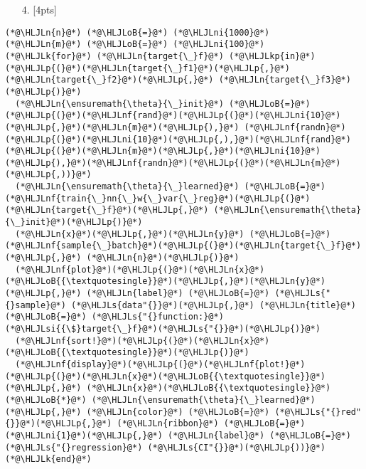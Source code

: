 \documentclass[12pt,a4paper]{article}
\newcommand{\HLJLk}[1]{\textcolor[RGB]{148,91,176}{\textbf{#1}}}
\newcommand{\HLJLkp}[1]{\textcolor[RGB]{148,91,176}{\textbf{#1}}}
\newcommand{\HLJLn}[1]{#1}
\newcommand{\HLJLnf}[1]{\textcolor[RGB]{66,102,213}{#1}}
\newcommand{\HLJLs}[1]{\textcolor[RGB]{201,61,57}{#1}}
\newcommand{\HLJLsi}[1]{#1}
\newcommand{\HLJLni}[1]{\textcolor[RGB]{59,151,46}{#1}}
\newcommand{\HLJLoB}[1]{\textcolor[RGB]{102,102,102}{\textbf{#1}}}
\newcommand{\HLJLp}[1]{#1}
\begin{document}
\begin{itemize}
\item[4. ] [4pts]

\end{itemize}

\begin{lstlisting}
(*@\HLJLn{n}@*) (*@\HLJLoB{=}@*) (*@\HLJLni{1000}@*)
(*@\HLJLn{m}@*) (*@\HLJLoB{=}@*) (*@\HLJLni{100}@*)
(*@\HLJLk{for}@*) (*@\HLJLn{target{\_}f}@*) (*@\HLJLkp{in}@*) (*@\HLJLp{(}@*)(*@\HLJLn{target{\_}f1}@*)(*@\HLJLp{,}@*) (*@\HLJLn{target{\_}f2}@*)(*@\HLJLp{,}@*) (*@\HLJLn{target{\_}f3}@*)(*@\HLJLp{)}@*)
  (*@\HLJLn{\ensuremath{\theta}{\_}init}@*) (*@\HLJLoB{=}@*) (*@\HLJLp{(}@*)(*@\HLJLnf{rand}@*)(*@\HLJLp{(}@*)(*@\HLJLni{10}@*)(*@\HLJLp{,}@*)(*@\HLJLn{m}@*)(*@\HLJLp{),}@*) (*@\HLJLnf{randn}@*)(*@\HLJLp{(}@*)(*@\HLJLni{10}@*)(*@\HLJLp{,),}@*)(*@\HLJLnf{rand}@*)(*@\HLJLp{(}@*)(*@\HLJLn{m}@*)(*@\HLJLp{,}@*)(*@\HLJLni{10}@*)(*@\HLJLp{),}@*)(*@\HLJLnf{randn}@*)(*@\HLJLp{(}@*)(*@\HLJLn{m}@*)(*@\HLJLp{,))}@*)
  (*@\HLJLn{\ensuremath{\theta}{\_}learned}@*) (*@\HLJLoB{=}@*) (*@\HLJLnf{train{\_}nn{\_}w{\_}var{\_}reg}@*)(*@\HLJLp{(}@*)(*@\HLJLn{target{\_}f}@*)(*@\HLJLp{,}@*) (*@\HLJLn{\ensuremath{\theta}{\_}init}@*)(*@\HLJLp{)}@*)
  (*@\HLJLn{x}@*)(*@\HLJLp{,}@*)(*@\HLJLn{y}@*) (*@\HLJLoB{=}@*) (*@\HLJLnf{sample{\_}batch}@*)(*@\HLJLp{(}@*)(*@\HLJLn{target{\_}f}@*)(*@\HLJLp{,}@*) (*@\HLJLn{n}@*)(*@\HLJLp{)}@*)
  (*@\HLJLnf{plot}@*)(*@\HLJLp{(}@*)(*@\HLJLn{x}@*)(*@\HLJLoB{{\textquotesingle}}@*)(*@\HLJLp{,}@*)(*@\HLJLn{y}@*)(*@\HLJLp{,}@*) (*@\HLJLn{label}@*) (*@\HLJLoB{=}@*) (*@\HLJLs{"{}sample}@*) (*@\HLJLs{data"{}}@*)(*@\HLJLp{,}@*) (*@\HLJLn{title}@*) (*@\HLJLoB{=}@*) (*@\HLJLs{"{}function:}@*) (*@\HLJLsi{{\$}target{\_}f}@*)(*@\HLJLs{"{}}@*)(*@\HLJLp{)}@*)
  (*@\HLJLnf{sort!}@*)(*@\HLJLp{(}@*)(*@\HLJLn{x}@*)(*@\HLJLoB{{\textquotesingle}}@*)(*@\HLJLp{)}@*)
  (*@\HLJLnf{display}@*)(*@\HLJLp{(}@*)(*@\HLJLnf{plot!}@*)(*@\HLJLp{(}@*)(*@\HLJLn{x}@*)(*@\HLJLoB{{\textquotesingle}}@*)(*@\HLJLp{,}@*) (*@\HLJLn{x}@*)(*@\HLJLoB{{\textquotesingle}}@*) (*@\HLJLoB{*}@*) (*@\HLJLn{\ensuremath{\theta}{\_}learned}@*)(*@\HLJLp{,}@*) (*@\HLJLn{color}@*) (*@\HLJLoB{=}@*) (*@\HLJLs{"{}red"{}}@*)(*@\HLJLp{,}@*) (*@\HLJLn{ribbon}@*) (*@\HLJLoB{=}@*) (*@\HLJLni{1}@*)(*@\HLJLp{,}@*) (*@\HLJLn{label}@*) (*@\HLJLoB{=}@*) (*@\HLJLs{"{}regression}@*) (*@\HLJLs{CI"{}}@*)(*@\HLJLp{))}@*)
(*@\HLJLk{end}@*)
\end{lstlisting}
\end{document}
